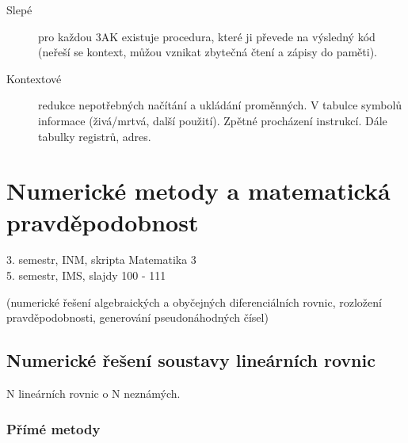 \documentclass[a4paper, 11pt]{report}
\begin{document}
\begin{description}
	\item[Slepé] pro každou 3AK existuje procedura, které ji převede na výsledný kód (neřeší se kontext, můžou vznikat zbytečná čtení a zápisy do paměti).
	\item[Kontextové] redukce nepotřebných načítání a ukládání proměnných. V tabulce symbolů informace (živá/mrtvá, další použití). Zpětné procházení instrukcí. Dále tabulky registrů, adres.
\end{description}












































\chapter{Numerické metody a matematická pravděpodobnost} \label{cha:23}

3. semestr, INM, skripta Matematika 3\\
5. semestr, IMS, slajdy 100 - 111

(numerické řešení algebraických a obyčejných diferenciálních rovnic, rozložení pravděpodobnosti, generování pseudonáhodných čísel)

\section{Numerické řešení soustavy lineárních rovnic}

N lineárních rovnic o N neznámých.


\subsection{Přímé metody}
\end{document}
